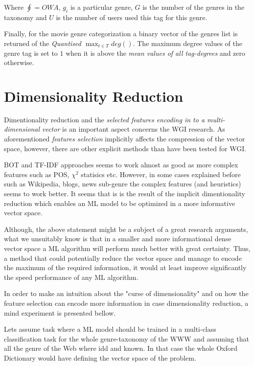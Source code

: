 Where $\oint=OWA$,  $g_{i}$ is a particular genre, $G$ is the number of the genres in the taxonomy and $U$ is the number of users used this tag for this genre.

Finally, for the movie genre categorization a binary vector of the genres list is returned of the \textit{Quantised  $\max_{t \in T} deg()$}. The maximum degree values of the genre tag is set to $1$ when it is above the \textit{mean values of all tag-degrees} and zero otherwise.

\section{Dimensionality Reduction}

Dimentionality reduction and the \textit{selected features encoding in to a multi-dimensional vector} is an important aspect concerns the WGI research. As aforementioned \textit{features selection} implicitly affects the compression of the vector space, however, there are other explicit methods than have been tested for WGI.

BOT and TF-IDF approaches seems to work almost as good as more complex features such as POS, $\chi^{2}$ statisics etc. However, in some cases explained before such as Wikipedia, blogs, news sub-genre the complex features (and heuristics) seems to work better. It seems that is is the result of the implicit dimentionality reduction which enables an ML model to be optimized in a more informative vector space.

Although, the above statement might be a subject of a great research arguments, what we unsuitably know is that in a smaller and more informational dense vector space a ML algorithm will perform much better with great certainty. Thus, a method that could potentially reduce the vector space and manage to encode the maximum of the required information, it would at least improve significantly the speed performance of any ML algorithm. 

In order to make an intuition about the "curse of dimensionality"  and on how the feature selection can encode more information in case dimensionality reduction, a mind experiment is presented bellow. 

Lets assume task where a ML model should be trained in a multi-class classification task for the whole genre-taxonomy of the WWW and assuming that all the genre of the Web where idd and known. In that case the whole Oxford Dictionary would have defining the vector space of the problem. 

